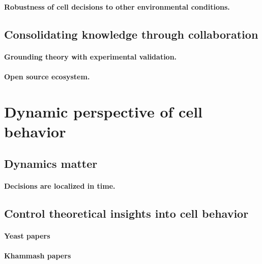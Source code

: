 		\paragraph{Robustness of cell decisions to other environmental conditions.}	
					
	\subsection{Consolidating knowledge through collaboration}
	
		\paragraph{Grounding theory with experimental validation.}		
		\paragraph{Open source ecosystem.}


\section{Dynamic perspective of cell behavior}
	\subsection{Dynamics matter}
		\paragraph{Decisions are localized in time.}
	\subsection{Control theoretical insights into cell behavior}
		\paragraph{Yeast papers}
		\paragraph{Khammash papers}




